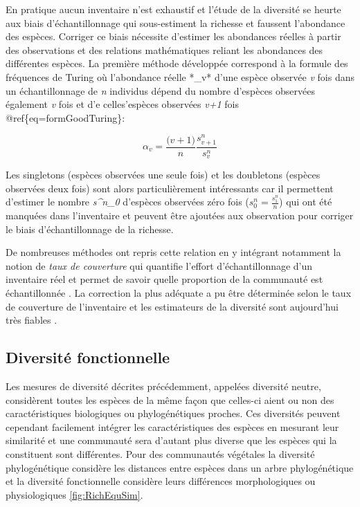\documentclass[
  11pt,
  french,
  A4paper,
  extrafontsizes,onecolumn,openright
  ]{memoir}
\begin{document}
En pratique aucun inventaire n'est exhaustif et l'étude de la diversité
se heurte aux biais d'échantillonnage qui sous-estiment la richesse et
faussent l'abondance des espèces. Corriger ce biais nécessite d'estimer
les abondances réelles à partir des observations et des relations
mathématiques reliant les abondances des différentes espèces. La
première méthode développée correspond à la formule des fréquences de
Turing \autocite{Good1953} où l'abondance réelle *\alpha\_v* d'une
espèce observée \emph{v} fois dans un échantillonnage de \emph{n}
individus dépend du nombre d'espèces observées également \emph{v} fois
et d'e celles'espèces observées \emph{v+1} fois
@ref\{eq=formGoodTuring\}:

\begin{equation}
\alpha_v=\frac{\big(v+1\big)}{n}\frac{s^n_{v+1}}{s^n_v}
\label{eq:formGoodTuring}
\end{equation}

Les singletons (espèces observées une seule fois) et les doubletons
(espèces observées deux fois) sont alors particulièrement intéressants
car il permettent d'estimer le nombre \emph{s\^{}n\_0} d'espèces
observées zéro fois (\(s^n_0=\frac{s^n_1}{n}\)) qui ont été manquées
dans l'inventaire et peuvent être ajoutées aux observation pour corriger
le biais d'échantillonnage de la richesse.

De nombreuses méthodes ont repris cette relation en y intégrant
notamment la notion de \emph{taux de couverture} qui quantifie l'effort
d'échantillonnage d'un inventaire réel et permet de savoir quelle
proportion de la communauté est échantillonnée \autocite{Dauby2012}. La
correction la plus adéquate a pu être déterminée selon le taux de
couverture de l'inventaire et les estimateurs de la diversité sont
aujourd'hui très fiables \autocites{Chao2015}{Marcon2015b}.

\subsection{Diversité fonctionnelle}\label{diversite-fonctionnelle}

Les mesures de diversité décrites précédemment, appelées diversité
neutre, considèrent toutes les espèces de la même façon que celles-ci
aient ou non des caractéristiques biologiques ou phylogénétiques
proches. Ces diversités peuvent cependant facilement intégrer les
caractéristiques des espèces en mesurant leur similarité et une
communauté sera d'autant plus diverse que les espèces qui la constituent
sont différentes. Pour des communautés végétales la diversité
phylogénétique considère les distances entre espèces dans un arbre
phylogénétique et la diversité fonctionnelle considère leurs différences
morphologiques ou physiologiques \ref{fig:RichEquSim}.
\end{document}
